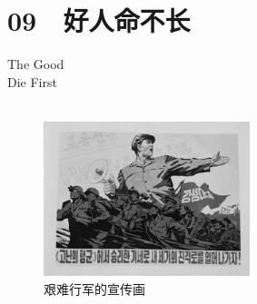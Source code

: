 \fancyhead[RO]{{\tiny{\textcolor{Gray}{\FA \ }}}\thepage}
\fancyhead[LE]{{\tiny{\textcolor{Gray}{\FA \ }}}\thepage}
\fancyfoot[LE,RO]{}
\fancyfoot[LO,CE]{}
\fancyfoot[CO,RE]{}
\chapter*{09 {\FA } 好人命不长}
\vspace{5mm}
\begin{flushright}
	\textcolor{PinYinColor}{\EN \huge{The Good\\
	Die First\\
	\ \\}}
\end{flushright}

\begin{figure}[!htbp]
	\centering
	\includegraphics[width=6cm]{./Chapters/Images/09.jpg}
	\caption*{艰难行军的宣传画}
\end{figure}

